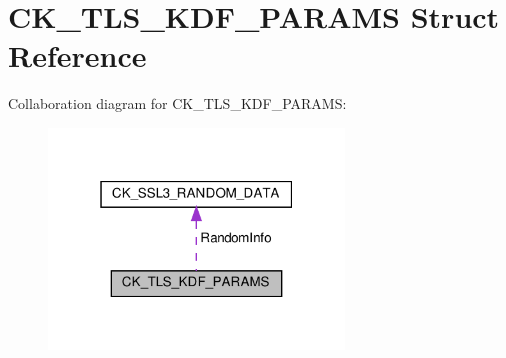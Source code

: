 \hypertarget{struct_c_k___t_l_s___k_d_f___p_a_r_a_m_s}{}\section{C\+K\+\_\+\+T\+L\+S\+\_\+\+K\+D\+F\+\_\+\+P\+A\+R\+A\+MS Struct Reference}
\label{struct_c_k___t_l_s___k_d_f___p_a_r_a_m_s}


Collaboration diagram for C\+K\+\_\+\+T\+L\+S\+\_\+\+K\+D\+F\+\_\+\+P\+A\+R\+A\+MS\+:
\nopagebreak
\begin{figure}[H]
\begin{center}
\leavevmode
\includegraphics[width=223pt]{struct_c_k___t_l_s___k_d_f___p_a_r_a_m_s__coll__graph}
\end{center}
\end{figure}
